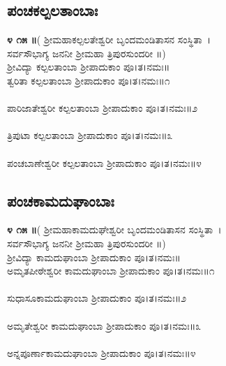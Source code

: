 \subsection{ಪಂಚಕಲ್ಪಲತಾಂಬಾಃ}
{\bfseries ೪ ೧೫ ॥}( ಶ್ರೀಮಹಾಕಲ್ಪಲತೇಶ್ವರೀ ಬೃಂದಮಂಡಿತಾಸನ ಸಂಸ್ಥಿತಾ~।\\
ಸರ್ವಸೌಭಾಗ್ಯ ಜನನೀ ಶ್ರೀಮಹಾ ತ್ರಿಪುರಸುಂದರೀ ॥)\\
ಶ್ರೀವಿದ್ಯಾ ಕಲ್ಪಲತಾಂಬಾ ಶ್ರೀಪಾದುಕಾಂ ಪೂ।ತ।ನಮಃ॥\\
 ತ್ವರಿತಾ ಕಲ್ಪಲತಾಂಬಾ ಶ್ರೀಪಾದುಕಾಂ ಪೂ।ತ।ನಮಃ॥೧\\
\\ಪಾರಿಜಾತೇಶ್ವರೀ ಕಲ್ಪಲತಾಂಬಾ ಶ್ರೀಪಾದುಕಾಂ ಪೂ।ತ।ನಮಃ॥೨\\
\\ ತ್ರಿಪುಟಾ ಕಲ್ಪಲತಾಂಬಾ ಶ್ರೀಪಾದುಕಾಂ ಪೂ।ತ।ನಮಃ॥೩\\
\\ ಪಂಚಬಾಣೇಶ್ವರೀ ಕಲ್ಪಲತಾಂಬಾ ಶ್ರೀಪಾದುಕಾಂ ಪೂ।ತ।ನಮಃ॥೪
\subsection{ಪಂಚಕಾಮದುಘಾಂಬಾಃ}
{\bfseries ೪ ೧೫ ॥}( ಶ್ರೀಮಹಾಕಾಮದುಘೇಶ್ವರೀ ಬೃಂದಮಂಡಿತಾಸನ ಸಂಸ್ಥಿತಾ~।\\
ಸರ್ವಸೌಭಾಗ್ಯ ಜನನೀ ಶ್ರೀಮಹಾ ತ್ರಿಪುರಸುಂದರೀ ॥)\\
ಶ್ರೀವಿದ್ಯಾ ಕಾಮದುಘಾಂಬಾ ಶ್ರೀಪಾದುಕಾಂ ಪೂ।ತ।ನಮಃ॥\\
 ಅಮೃತಪೀಠೇಶ್ವರೀ ಕಾಮದುಘಾಂಬಾ ಶ್ರೀಪಾದುಕಾಂ ಪೂ।ತ।ನಮಃ॥೧\\
\\ಸುಧಾಸೂಕಾಮದುಘಾಂಬಾ ಶ್ರೀಪಾದುಕಾಂ ಪೂ।ತ।ನಮಃ॥೨\\
\\ ಅಮೃತೇಶ್ವರೀ ಕಾಮದುಘಾಂಬಾ ಶ್ರೀಪಾದುಕಾಂ ಪೂ।ತ।ನಮಃ॥೩\\
\\ ಅನ್ನಪೂರ್ಣಾಕಾಮದುಘಾಂಬಾ ಶ್ರೀಪಾದುಕಾಂ ಪೂ।ತ।ನಮಃ॥೪
